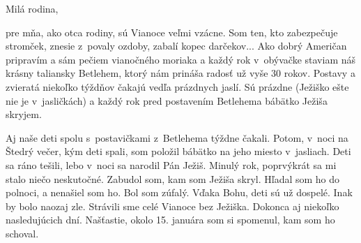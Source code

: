 








Milá rodina,

pre mňa, ako otca rodiny, sú Vianoce veľmi vzácne. Som ten, kto zabezpečuje stromček, znesie z~povaly ozdoby, zabalí kopec darčekov... Ako dobrý Američan pripravím a sám pečiem vianočného moriaka a každý rok v~obývačke staviam náš krásny taliansky Betlehem, ktorý nám prináša radosť už vyše 30 rokov. Postavy a zvieratá niekoľko týždňov čakajú vedľa prázdnych jaslí. Sú prázdne (Ježiško ešte nie je v~jasličkách) a každý rok pred postavením Betlehema bábätko Ježiša skryjem.

Aj naše deti spolu s~postavičkami z~Betlehema týždne čakali. Potom, v~noci na Štedrý večer, kým deti spali, som položil bábätko na jeho miesto v~jasliach. Deti sa ráno tešili, lebo v~noci sa narodil Pán Ježiš. Minulý rok, poprvýkrát sa mi stalo niečo neskutočné. Zabudol som, kam som Ježiša skryl. Hľadal som ho do polnoci, a nenašiel som ho. Bol som zúfalý. Vďaka Bohu, deti sú už dospelé. Inak by bolo naozaj zle. Strávili sme celé Vianoce bez Ježiška. Dokonca aj niekoľko nasledujúcich dní. Našťastie, okolo 15. januára som si spomenul, kam som ho schoval.

